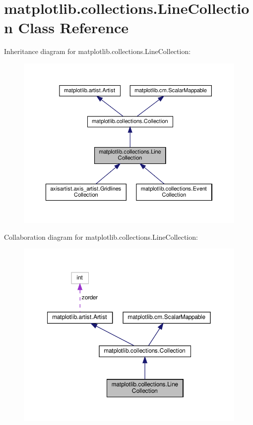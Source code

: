 \hypertarget{classmatplotlib_1_1collections_1_1LineCollection}{}\section{matplotlib.\+collections.\+Line\+Collection Class Reference}
\label{classmatplotlib_1_1collections_1_1LineCollection}


Inheritance diagram for matplotlib.\+collections.\+Line\+Collection\+:
\nopagebreak
\begin{figure}[H]
\begin{center}
\leavevmode
\includegraphics[width=350pt]{classmatplotlib_1_1collections_1_1LineCollection__inherit__graph}
\end{center}
\end{figure}


Collaboration diagram for matplotlib.\+collections.\+Line\+Collection\+:
\nopagebreak
\begin{figure}[H]
\begin{center}
\leavevmode
\includegraphics[width=350pt]{classmatplotlib_1_1collections_1_1LineCollection__coll__graph}
\end{center}
\end{figure}
